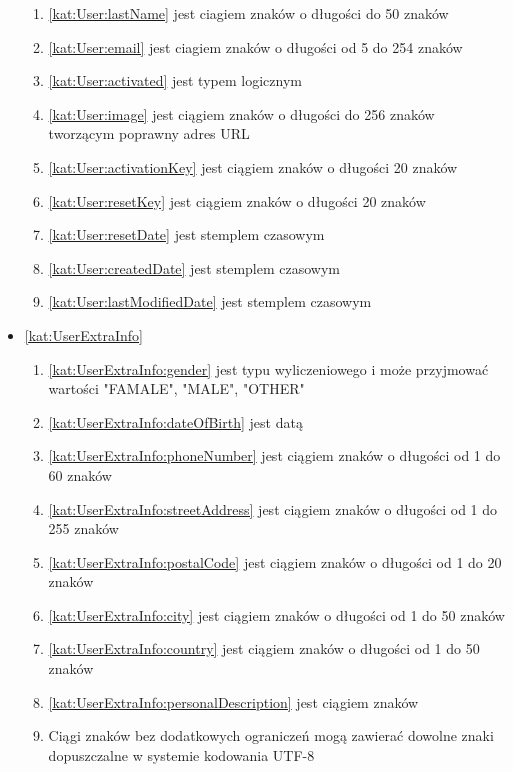 \begin{itemize}[label={\textbf{Ograniczenia dla}}, wide, labelwidth=!, labelindent=0pt]
\begin{enumerate}[label={\textbf{OGR/\protect\threedigits{\arabic{enumi}}}}, wide, labelwidth=!, align=left, leftmargin=3cm]
        \item \ref{kat:User:lastName} jest ciagiem znaków o długości do 50 znaków
        \item \ref{kat:User:email} jest ciagiem znaków o długości od 5 do 254 znaków
        \item \ref{kat:User:activated} jest typem logicznym
        \item \ref{kat:User:image} jest ciągiem znaków o długości do 256 znaków tworzącym poprawny adres URL
        \item \ref{kat:User:activationKey} jest ciągiem znaków o długości 20 znaków
        \item \ref{kat:User:resetKey} jest ciągiem znaków o długości 20 znaków
        \item \ref{kat:User:resetDate} jest stemplem czasowym
        \item \ref{kat:User:createdDate} jest stemplem czasowym
        \item \ref{kat:User:lastModifiedDate} jest stemplem czasowym
    \end{enumerate}
    \item\ref{kat:UserExtraInfo}
    \begin{enumerate}[label={\textbf{OGR/\protect\threedigits{\arabic{enumi}}}}, wide, labelwidth=!, align=left, leftmargin=3cm, resume]
        \item \ref{kat:UserExtraInfo:gender} jest typu wyliczeniowego i może przyjmować wartości "FAMALE", "MALE", "OTHER"
        \item \ref{kat:UserExtraInfo:dateOfBirth} jest datą
        \item \ref{kat:UserExtraInfo:phoneNumber} jest ciągiem znaków o długości od 1 do 60 znaków
        \item \ref{kat:UserExtraInfo:streetAddress} jest ciągiem znaków o długości od 1 do 255 znaków
        \item \ref{kat:UserExtraInfo:postalCode} jest ciągiem znaków o długości od 1 do 20 znaków
        \item \ref{kat:UserExtraInfo:city} jest ciągiem znaków o długości od 1 do 50 znaków
        \item \ref{kat:UserExtraInfo:country} jest ciągiem znaków o długości od 1 do 50 znaków
        \item \ref{kat:UserExtraInfo:personalDescription} jest ciągiem znaków
        \item Ciągi znaków bez dodatkowych ograniczeń mogą zawierać dowolne znaki dopuszczalne w systemie kodowania UTF-8
    \end{enumerate}

\end{itemize}
